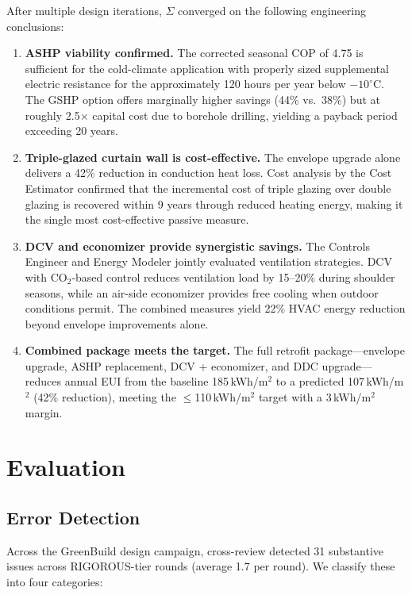 \documentclass[11pt,a4paper]{article}
\begin{document}
After multiple design iterations, $\Sigma$ converged on the following engineering conclusions:

\begin{enumerate}
    \item \textbf{ASHP viability confirmed.} The corrected seasonal COP of 4.75 is sufficient for the cold-climate application with properly sized supplemental electric resistance for the approximately 120 hours per year below $-10^\circ$C. The GSHP option offers marginally higher savings (44\% vs.\ 38\%) but at roughly 2.5$\times$ capital cost due to borehole drilling, yielding a payback period exceeding 20 years.
    \item \textbf{Triple-glazed curtain wall is cost-effective.} The envelope upgrade alone delivers a 42\% reduction in conduction heat loss. Cost analysis by the Cost Estimator confirmed that the incremental cost of triple glazing over double glazing is recovered within 9 years through reduced heating energy, making it the single most cost-effective passive measure.
    \item \textbf{DCV and economizer provide synergistic savings.} The Controls Engineer and Energy Modeler jointly evaluated ventilation strategies. DCV with CO$_2$-based control reduces ventilation load by 15--20\% during shoulder seasons, while an air-side economizer provides free cooling when outdoor conditions permit. The combined measures yield 22\% HVAC energy reduction beyond envelope improvements alone.
    \item \textbf{Combined package meets the target.} The full retrofit package---envelope upgrade, ASHP replacement, DCV + economizer, and DDC upgrade---reduces annual EUI from the baseline 185\,kWh/m$^2$ to a predicted 107\,kWh/m$^2$ (42\% reduction), meeting the $\leq$110\,kWh/m$^2$ target with a 3\,kWh/m$^2$ margin.
\end{enumerate}

\section{Evaluation}

\subsection{Error Detection}

Across the GreenBuild design campaign, cross-review detected 31 substantive issues across RIGOROUS-tier rounds (average 1.7 per round). We classify these into four categories:
\end{document}
